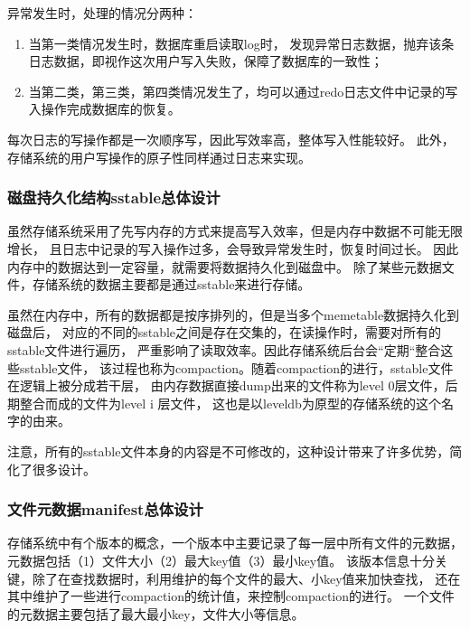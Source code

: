 	异常发生时，处理的情况分两种：
		\begin{enumerate}
			\item 当第一类情况发生时，数据库重启读取log时，
			发现异常日志数据，抛弃该条日志数据，即视作这次用户写入失败，保障了数据库的一致性；
			\item 当第二类，第三类，第四类情况发生了，均可以通过redo日志文件中记录的写入操作完成数据库的恢复。
		\end{enumerate}
		每次日志的写操作都是一次顺序写，因此写效率高，整体写入性能较好。
		此外，存储系统的用户写操作的原子性同样通过日志来实现。

		\subsubsection{磁盘持久化结构sstable总体设计}

		虽然存储系统采用了先写内存的方式来提高写入效率，但是内存中数据不可能无限增长，
		且日志中记录的写入操作过多，会导致异常发生时，恢复时间过长。
		因此内存中的数据达到一定容量，就需要将数据持久化到磁盘中。
		除了某些元数据文件，存储系统的数据主要都是通过sstable来进行存储。

		虽然在内存中，所有的数据都是按序排列的，但是当多个memetable数据持久化到磁盘后，
		对应的不同的sstable之间是存在交集的，在读操作时，需要对所有的sstable文件进行遍历，
		严重影响了读取效率。因此存储系统后台会“定期“整合这些sstable文件，
		该过程也称为compaction。随着compaction的进行，sstable文件在逻辑上被分成若干层，
		由内存数据直接dump出来的文件称为level 0层文件，后期整合而成的文件为level i 层文件，
		这也是以leveldb为原型的存储系统的这个名字的由来。

		注意，所有的sstable文件本身的内容是不可修改的，这种设计带来了许多优势，简化了很多设计。

		\subsubsection{文件元数据manifest总体设计}

		存储系统中有个版本的概念，一个版本中主要记录了每一层中所有文件的元数据，
		元数据包括（1）文件大小（2）最大key值（3）最小key值。
		该版本信息十分关键，除了在查找数据时，利用维护的每个文件的最大、小key值来加快查找，
		还在其中维护了一些进行compaction的统计值，来控制compaction的进行。
		一个文件的元数据主要包括了最大最小key，文件大小等信息。
		

